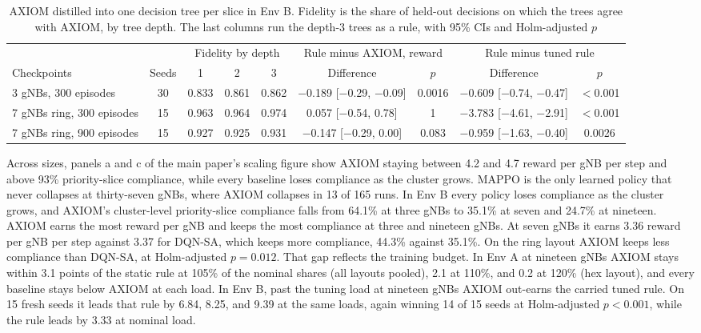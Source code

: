 \documentclass[9pt]{extarticle}
\begin{document}
\begin{table}[!htbp]
\caption{AXIOM distilled into one decision tree per slice in Env B. Fidelity is the share of held-out decisions on which the trees agree with AXIOM, by tree depth. The last columns run the depth-3 trees as a rule, with 95\% CIs and Holm-adjusted $p$}
\label{tab:s-distil}
\centering
\scriptsize
{\setlength{\tabcolsep}{3pt}
\begin{tabular}{@{}lcccccccc@{}}
\toprule
& & \multicolumn{3}{c}{Fidelity by depth} & \multicolumn{2}{c}{Rule minus AXIOM, reward} & \multicolumn{2}{c}{Rule minus tuned rule} \\
\cmidrule(lr){3-5}\cmidrule(lr){6-7}\cmidrule(l){8-9}
Checkpoints & Seeds & 1 & 2 & 3 & Difference & $p$ & Difference & $p$ \\
\midrule
3 gNBs, 300 episodes & 30 & 0.833 & 0.861 & 0.862 & $-$0.189 [$-$0.29, $-$0.09] & 0.0016 & $-$0.609 [$-$0.74, $-$0.47] & $<$0.001 \\
7 gNBs ring, 300 episodes & 15 & 0.963 & 0.964 & 0.974 & 0.057 [$-$0.54, 0.78] & 1 & $-$3.783 [$-$4.61, $-$2.91] & $<$0.001 \\
7 gNBs ring, 900 episodes & 15 & 0.927 & 0.925 & 0.931 & $-$0.147 [$-$0.29, 0.00] & 0.083 & $-$0.959 [$-$1.63, $-$0.40] & 0.0026 \\
\bottomrule
\end{tabular}}
\end{table}

Across sizes, panels a and c of the main paper's scaling figure show AXIOM staying between 4.2 and 4.7 reward per gNB per step and above 93\% priority-slice compliance, while every baseline loses compliance as the cluster grows. MAPPO is the only learned policy that never collapses at thirty-seven gNBs, where AXIOM collapses in 13 of 165 runs. In Env B every policy loses compliance as the cluster grows, and AXIOM's cluster-level priority-slice compliance falls from 64.1\% at three gNBs to 35.1\% at seven and 24.7\% at nineteen. AXIOM earns the most reward per gNB and keeps the most compliance at three and nineteen gNBs. At seven gNBs it earns 3.36 reward per gNB per step against 3.37 for DQN-SA, which keeps more compliance, 44.3\% against 35.1\%. On the ring layout AXIOM keeps less compliance than DQN-SA, at Holm-adjusted $p=0.012$. That gap reflects the training budget. In Env A at nineteen gNBs AXIOM stays within 3.1 points of the static rule at 105\% of the nominal shares (all layouts pooled), 2.1 at 110\%, and 0.2 at 120\% (hex layout), and every baseline stays below AXIOM at each load. In Env B, past the tuning load at nineteen gNBs AXIOM out-earns the carried tuned rule. On 15 fresh seeds it leads that rule by 6.84, 8.25, and 9.39 at the same loads, again winning 14 of 15 seeds at Holm-adjusted $p<0.001$, while the rule leads by 3.33 at nominal load.
\end{document}
